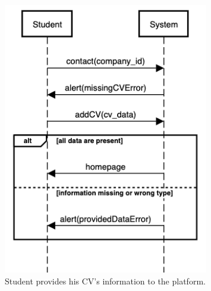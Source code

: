    \begin{figure}[H]
        \centering
        \includegraphics[width=0.8\textwidth]{RASD/Assets/SequenceDiagrams/2-student-provide-his-cv.png}
        \caption{Student provides his CV’s information to the platform.}
        \label{fig:Student provides his CV’s information to the platform}
    \end{figure}


